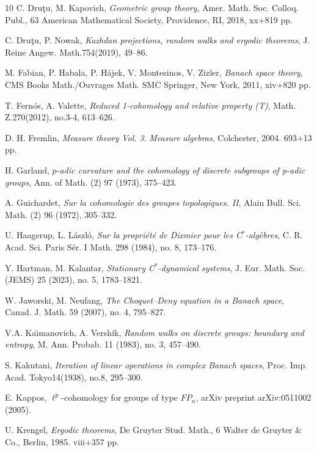 \documentclass[a4paper,11pt,reqno]{amsart}
\numberwithin{equation}{section}
\theoremstyle{definition}
\theoremstyle{remark}
\theoremstyle{remark}
\begin{document}
\begin{thebibliography}{10}
 C. Dru\c{t}u, M. Kapovich, \emph{Geometric group theory}, Amer. Math. Soc. Colloq. Publ., 63 American Mathematical Society, Providence, RI, 2018, xx+819 pp.

 C. Dru\c{t}u, P. Nowak, \emph{Kazhdan projections, random walks and ergodic theorems}, J. Reine Angew. Math.754(2019), 49--86.

 M. Fabian, P. Habala, P. Hájek, V. Montesinos, V. Zizler, \emph{Banach space theory}, CMS Books Math./Ouvrages Math. SMC Springer, New York, 2011, xiv+820 pp.

 T. Fernós, A. Valette, \emph{Reduced 1-cohomology and relative property (T)}, Math. Z.270(2012), no.3-4, 613--626.

 D. H. Fremlin, \emph{Measure theory} \emph{Vol. 3}. \emph{Measure algebras}, Colchester, 2004. 693+13 pp.

 H. Garland, \emph{$p$-adic curvature and the cohomology of discrete subgroups of p-adic groups}, Ann. of Math. (2) 97 (1973), 375--423.

 A. Guichardet, \emph{Sur la cohomologie des groupes topologiques. II}, Alain Bull. Sci. Math. (2) 96 (1972), 305--332.

 U. Haagerup, L. László, \emph{Sur la propriété de Dixmier pour les C$^{\ast}$-algèbres}, C. R. Acad. Sci. Paris Sér. I Math. 298 (1984), no. 8, 173--176.

 Y. Hartman, M. Kalantar, \emph{Stationary C$^{\ast}$-dynamical systems}, J. Eur. Math. Soc. (JEMS) 25 (2023), no. 5, 1783--1821.

 W. Jaworski, M. Neufang, \emph{The Choquet--Deny equation in a Banach space}, Canad. J. Math. 59 (2007), no. 4, 795--827.

 V.A. Ka\u{\i}manovich, A. Vershik, \emph{Random walks on discrete groups: boundary and entropy}, M. Ann. Probab. 11 (1983), no. 3, 457--490.

 S. Kakutani, \emph{Iteration of linear operations in complex Banach spaces}, Proc. Imp. Acad. Tokyo14(1938), no.8, 295--300.

 E. Kappos, $\ell^{p}$-cohomology for groups of type $FP_{n}$, arXiv preprint arXiv:0511002 (2005).

 U. Krengel, \emph{Ergodic theorems}, De Gruyter Stud. Math., 6 Walter de Gruyter \& Co., Berlin, 1985. viii+357 pp.


\end{thebibliography}
\end{document}
